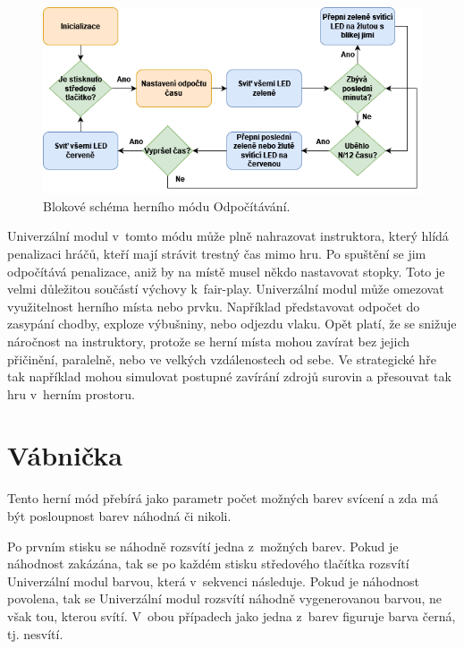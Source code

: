 \begin{figure}[!h]
  \begin{center}
    \includegraphics[scale=0.65]{obrazky/Odpocitavani_diagram.png}
  \end{center}
  \caption[Blokové schéma herního módu Odpočítávání]{Blokové schéma herního módu Odpočítávání.}
\end{figure}

Univerzální modul v~tomto módu může plně nahrazovat instruktora, který hlídá penalizaci hráčů, kteří mají strávit trestný čas mimo hru. Po spuštění se jim odpočítává penalizace, aniž by na místě musel 
někdo nastavovat stopky. Toto je velmi důležitou součástí výchovy k~fair-play. Univerzální modul může omezovat využitelnost herního místa nebo prvku. Například představovat odpočet do zasypání chodby, 
exploze výbušniny, nebo odjezdu vlaku. Opět platí, že se snižuje náročnost na instruktory, protože se herní místa mohou zavírat bez jejich přičinění, paralelně, nebo ve velkých vzdálenostech od sebe. 
Ve strategické hře tak například mohou simulovat postupné zavírání zdrojů surovin a přesouvat tak hru v~herním prostoru.

\section{Vábnička}
Tento herní mód přebírá jako parametr počet možných barev svícení a zda má být posloupnost barev náhodná či nikoli.

Po prvním stisku se náhodně rozsvítí jedna z~možných barev. Pokud je náhodnost zakázána, tak se po každém stisku středového tlačítka rozsvítí Univerzální modul barvou, která v~sekvenci následuje. Pokud 
je náhodnost povolena, tak se Univerzální modul rozsvítí náhodně vygenerovanou barvou, ne však tou, kterou svítí. V~obou případech jako jedna z~barev figuruje barva černá, tj. nesvítí. 

